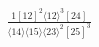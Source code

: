 \documentclass[varwidth, border=5pt]{standalone}
\begin{document}
\begin{my}
$\begin{gathered}
\scriptscriptstyle\frac{1[12]^2⟨12⟩^3[24]}{⟨14⟩⟨15⟩⟨23⟩^2[25]^3}
\end{gathered}$
\end{my}
\end{document}
